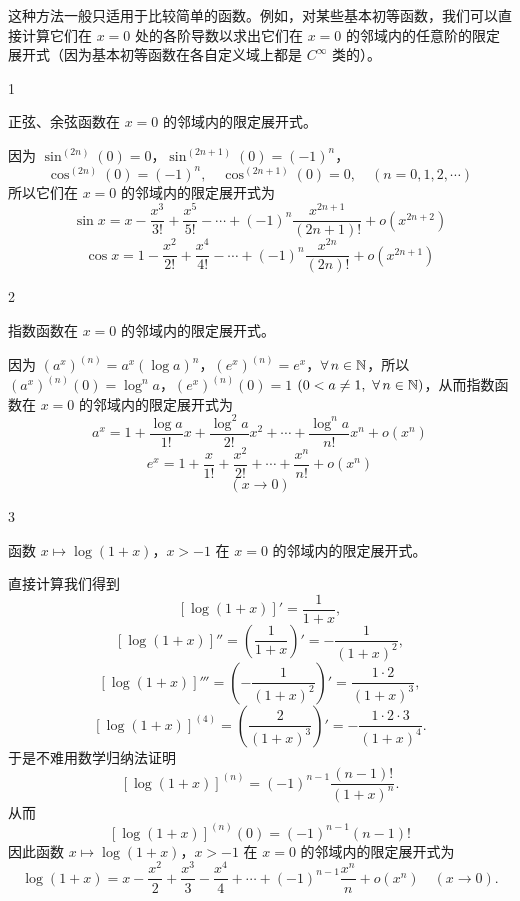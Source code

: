 这种方法一般只适用于比较简单的函数。例如，对某些基本初等函数，我们可以直接计算它们在 $x=0$ 处的各阶导数以求出它们在 $x=0$ 的邻域内的任意阶的限定展开式（因为基本初等函数在各自定义域上都是 $C^{\infty}$ 类的）。

\begin{sourceexample}{1}

正弦、余弦函数在 $x=0$ 的邻域内的限定展开式。

因为 $\sin^{(2n)}(0)=0$，$\sin^{(2n+1)}(0)=(-1)^n$，
\[\cos^{(2n)}(0)=(-1)^n,\quad \cos^{(2n+1)}(0)=0,\quad(n=0,1,2,\cdots)\]
所以它们在 $x=0$ 的邻域内的限定展开式为
\[\sin x=x-\frac{x^3}{3!}+\frac{x^5}{5!}-\cdots+(-1)^n\frac{x^{2n+1}}{(2n+1)!}+o(x^{2n+2})\]
\[\cos x=1-\frac{x^2}{2!}+\frac{x^4}{4!}-\cdots+(-1)^n\frac{x^{2n}}{(2n)!}+o(x^{2n+1})\]

\end{sourceexample}

\begin{sourceexample}{2}

指数函数在 $x=0$ 的邻域内的限定展开式。

因为 $(a^x)^{(n)}=a^x(\log a)^n$，$(e^x)^{(n)}=e^x$，$\forall\,n\in\mathbb{N}$，所以 $(a^x)^{(n)}(0)=\log^n a$，$(e^x)^{(n)}(0)=1$ $(0<a\neq1,\ \forall\,n\in\N)$，从而指数函数在 $x=0$ 的邻域内的限定展开式为
\[a^{x}=1+\frac{\log a}{1!}x+\frac{\log^{2}a}{2!}x^{2}+\cdots+\frac{\log^{n}a}{n!}x^{n}+o(x^{n})\]
\[e^{x}=1+\frac{x}{1!}+\frac{x^{2}}{2!}+\cdots+\frac{x^{n}}{n!}+o(x^{n})\]
\[(x\to0)\]

\end{sourceexample}

\begin{sourceexample}{3}

函数 $x\longmapsto\log(1+x)$，$x>-1$ 在 $x=0$ 的邻域内的限定展开式。

直接计算我们得到
\[[\log(1+x)]'=\frac{1}{1+x},\]
\[[\log(1+x)]''=\left(\frac{1}{1+x}\right)'=-\frac{1}{(1+x)^2},\]
\[[\log(1+x)]'''=\left(-\frac{1}{(1+x)^2}\right)'=\frac{1\cdot2}{(1+x)^3},\]
\[[\log(1+x)]^{(4)}=\left(\frac{2}{(1+x)^3}\right)'=-\frac{1\cdot2\cdot3}{(1+x)^4}.\]
于是不难用数学归纳法证明
\[[\log(1+x)]^{(n)}=(-1)^{n-1}\frac{(n-1)!}{(1+x)^n}.\]
从而
\[[\log(1+x)]^{(n)}(0)=(-1)^{n-1}(n-1)!\]
因此函数 $x\longmapsto\log(1+x)$，$x>-1$ 在 $x=0$ 的邻域内的限定展开式为
\[\log(1+x)=x-\frac{x^2}{2}+\frac{x^3}{3}-\frac{x^4}{4}+\cdots+(-1)^{n-1}\frac{x^n}{n}+o(x^n)\quad(x\to0).\]

\end{sourceexample}

